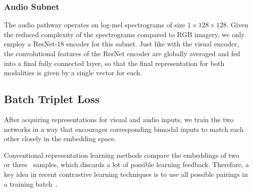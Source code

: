 \documentclass[journal]{IEEEtran}
\begin{document}
\subsubsection{Audio Subnet}
The audio pathway operates on log-mel spectrograms of size $1 \times 128 \times 128$.
Given the reduced complexity of the spectrograms compared to RGB imagery,
we only employ a ResNet-18 encoder for this subnet.
Just like with the visual encoder,
the convolutional features of the ResNet encoder are
globally averaged and fed into a final fully connected layer,
so that the final representation for both modalities is
given by a single vector for each.

\subsection{Batch Triplet Loss}
After acquiring representations for visual and audio inputs,
we train the two networks in a way that encourages corresponding
bimodal inputs to match each other closely in the embedding space.

Conventional representation learning methods
compare the embeddings of two~\cite{hadsell_dimensionality_2006}
or three~\cite{weinberger_distance_2009,schroff_facenet_2015} samples,
which discards a lot of possible learning feedback.
Therefore, a key idea in recent contrastive learning techniques
is to use all possible pairings in a training batch~\cite{simclr}.
\end{document}
